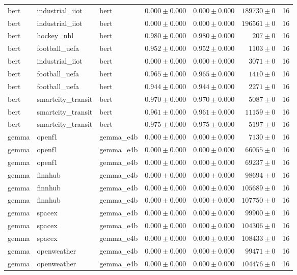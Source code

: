 \begin{table}[htbp]
\begin{tabular}{l l l r r r r}
bert & industrial\_iiot & bert & $0.000\pm0.000$ & $0.000\pm0.000$ & $189730\pm0$ & 16 \\
bert & industrial\_iiot & bert & $0.000\pm0.000$ & $0.000\pm0.000$ & $196561\pm0$ & 16 \\
bert & hockey\_nhl & bert & $0.980\pm0.000$ & $0.980\pm0.000$ & $207\pm0$ & 16 \\
bert & football\_uefa & bert & $0.952\pm0.000$ & $0.952\pm0.000$ & $1103\pm0$ & 16 \\
bert & industrial\_iiot & bert & $0.000\pm0.000$ & $0.000\pm0.000$ & $3071\pm0$ & 16 \\
bert & football\_uefa & bert & $0.965\pm0.000$ & $0.965\pm0.000$ & $1410\pm0$ & 16 \\
bert & football\_uefa & bert & $0.944\pm0.000$ & $0.944\pm0.000$ & $2271\pm0$ & 16 \\
bert & smartcity\_transit & bert & $0.970\pm0.000$ & $0.970\pm0.000$ & $5087\pm0$ & 16 \\
bert & smartcity\_transit & bert & $0.961\pm0.000$ & $0.961\pm0.000$ & $11159\pm0$ & 16 \\
bert & smartcity\_transit & bert & $0.975\pm0.000$ & $0.975\pm0.000$ & $5197\pm0$ & 16 \\
gemma & openf1 & gemma\_e4b & $0.000\pm0.000$ & $0.000\pm0.000$ & $7130\pm0$ & 16 \\
gemma & openf1 & gemma\_e4b & $0.000\pm0.000$ & $0.000\pm0.000$ & $66055\pm0$ & 16 \\
gemma & openf1 & gemma\_e4b & $0.000\pm0.000$ & $0.000\pm0.000$ & $69237\pm0$ & 16 \\
gemma & finnhub & gemma\_e4b & $0.000\pm0.000$ & $0.000\pm0.000$ & $98694\pm0$ & 16 \\
gemma & finnhub & gemma\_e4b & $0.000\pm0.000$ & $0.000\pm0.000$ & $105689\pm0$ & 16 \\
gemma & finnhub & gemma\_e4b & $0.000\pm0.000$ & $0.000\pm0.000$ & $107750\pm0$ & 16 \\
gemma & spacex & gemma\_e4b & $0.000\pm0.000$ & $0.000\pm0.000$ & $99900\pm0$ & 16 \\
gemma & spacex & gemma\_e4b & $0.000\pm0.000$ & $0.000\pm0.000$ & $104306\pm0$ & 16 \\
gemma & spacex & gemma\_e4b & $0.000\pm0.000$ & $0.000\pm0.000$ & $108433\pm0$ & 16 \\
gemma & openweather & gemma\_e4b & $0.000\pm0.000$ & $0.000\pm0.000$ & $99471\pm0$ & 16 \\
gemma & openweather & gemma\_e4b & $0.000\pm0.000$ & $0.000\pm0.000$ & $104476\pm0$ & 16 \\

\end{tabular}
\end{table}
